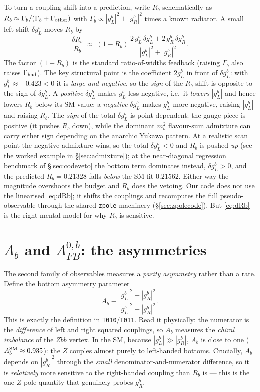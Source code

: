 \documentclass[11pt]{article}
\newcommand{\code}[1]{\texttt{#1}}
\newcommand{\gL}{g_L^b}
\newcommand{\gR}{g_R^b}
\newcommand{\dgL}{\delta g_L^b}
\newcommand{\dgR}{\delta g_R^b}
\newcommand{\Afb}{A_{FB}^{0,b}}
\theoremstyle{definition}
\begin{document}
To turn a coupling shift into a prediction, write $R_b$ schematically as
$R_b \approx \Gamma_b/(\Gamma_b + \Gamma_{\rm other})$ with
$\Gamma_b \propto |\gL|^2 + |\gR|^2$ times a known radiator. A small left shift
$\dgL$ moves $R_b$ by
\begin{equation}
\frac{\delta R_b}{R_b} \;\approx\; (1-R_b)\,\frac{2\,\gL\,\dgL + 2\,\gR\,\dgR}
{|\gL|^2+|\gR|^2}.
\label{eq:dRb}
\end{equation}
The factor $(1-R_b)$ is the standard ratio-of-widths feedback (raising
$\Gamma_b$ also raises $\Gamma_{\rm had}$). The key structural point is the
coefficient $2\gL$ in front of $\dgL$: with $\gL\approx-0.423<0$ it is
\emph{large and negative}, so the \emph{sign} of the $R_b$ shift is opposite to
the sign of $\dgL$. A \emph{positive} $\dgL$ makes $\gL$ less negative, i.e.\ it
\emph{lowers} $|\gL|$ and hence lowers $R_b$ below its SM value; a \emph{negative}
$\dgL$ makes $\gL$ more negative, raising $|\gL|$ and raising $R_b$. The
\emph{sign} of the total $\dgL$ is point-dependent: the gauge piece is positive
(it pushes $R_b$ down), while the dominant $m_b^2$ flavour-sum admixture can carry
either sign depending on the anarchic Yukawa pattern. At a realistic scan point
the negative admixture wins, so the total $\dgL<0$ and $R_b$ is pushed
\emph{up} (see the worked example in \S\ref{sec:admixture}); at the near-diagonal
regression benchmark of \S\ref{sec:codeveto} the bottom term dominates instead,
$\dgL>0$, and the predicted $R_b=0.21328$ falls \emph{below} the SM fit $0.21562$.
Either way the magnitude overshoots the budget and $R_b$ does the vetoing. Our
code does not use the linearised
\eqref{eq:dRb}; it shifts the couplings and recomputes the full pseudo-observable
through the shared \code{zpole} machinery (\S\ref{sec:zpolecode}). But
\eqref{eq:dRb} is the right mental model for why $R_b$ is sensitive.

\section{$A_b$ and $\Afb$: the asymmetries}
\label{sec:Ab}

The second family of observables measures a \emph{parity asymmetry} rather than a
rate. Define the bottom asymmetry parameter
\begin{equation}
A_b \equiv \frac{|\gL|^2 - |\gR|^2}{|\gL|^2 + |\gR|^2}.
\label{eq:Abdef}
\end{equation}
This is exactly the definition in \code{T010}/\code{T011}. Read it physically:
the numerator is the \emph{difference} of left and right squared couplings, so
$A_b$ measures the \emph{chiral imbalance} of the $Zb\bar b$ vertex. In the SM,
because $|\gL|\gg|\gR|$, $A_b$ is close to one ($A_b^{\rm SM}\approx 0.935$): the
$Z$ couples almost purely to left-handed bottoms. Crucially, $A_b$ depends on
$|\gR|^2$ through the \emph{small} denominator-and-numerator difference, so it is
\emph{relatively} more sensitive to the right-handed coupling than $R_b$ is ---
this is the one $Z$-pole quantity that genuinely probes $\gR$.
\end{document}
